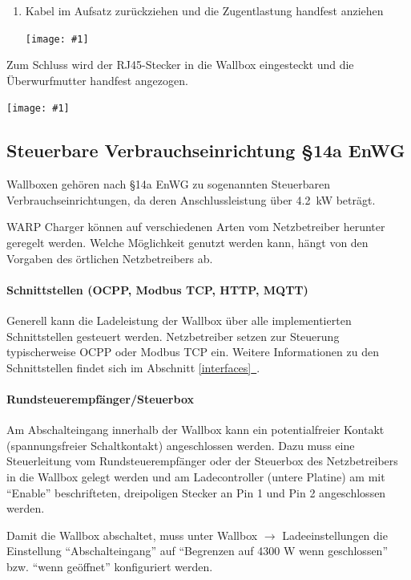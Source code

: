 \documentclass[a4paper,10pt]{article}
\newcommand{\gfx}[1]{\texttt{[image: \#1]}}
\newcommand*{\fullref}[1]{Abschnitt \hyperref[{#1}]{\ref*{#1}~\nameref*{#1}}}
\begin{document}
\begin{multicols*}{2}
\begin{enumerate}
        \item Kabel im Aufsatz zurückziehen und die Zugentlastung handfest anziehen

        \gfx{./img_warp2/resized/warp2_rj45_2_600}
    \end{enumerate}

    Zum Schluss wird der RJ45-Stecker in die Wallbox eingesteckt und die Überwurfmutter
    handfest angezogen.

    \gfx{./img_warp2/resized/warp2_ethernet4_600} %

    \subsection{Steuerbare Verbrauchseinrichtung \S14a EnWG}
    Wallboxen gehören nach \S14a EnWG zu sogenannten Steuerbaren
    Verbrauchseinrichtungen, da deren Anschlussleistung über \SI{4,2}{\kilo\watt} beträgt.

    WARP Charger können auf verschiedenen Arten vom Netzbetreiber herunter
    geregelt werden. Welche Möglichkeit genutzt werden kann, hängt von den
    Vorgaben des örtlichen Netzbetreibers ab.

    \paragraph*{Schnittstellen (OCPP, Modbus TCP, HTTP, MQTT)}
    Generell kann die Ladeleistung der Wallbox über alle implementierten Schnittstellen gesteuert werden.
    Netzbetreiber setzen zur Steuerung typischerweise OCPP oder Modbus TCP ein.
    Weitere Informationen zu den Schnittstellen findet sich im \fullref{interfaces}.

    \paragraph*{Rundsteuerempfänger/Steuerbox}
    Am Abschalteingang innerhalb der Wallbox kann ein potentialfreier Kontakt (spannungsfreier Schaltkontakt)
    angeschlossen werden. Dazu muss eine Steuerleitung vom Rundsteuerempfänger
    oder der Steuerbox des Netzbetreibers in die Wallbox gelegt werden und am Ladecontroller (untere Platine)
    am mit \enquote{Enable} beschrifteten, dreipoligen Stecker an Pin 1 und Pin 2 angeschlossen werden.

    Damit die Wallbox abschaltet, muss unter Wallbox $\rightarrow$ Ladeeinstellungen die Einstellung \enquote{Abschalteingang} auf \enquote{Begrenzen auf 4300 W wenn geschlossen} bzw. \enquote{wenn geöffnet} konfiguriert werden.


\end{multicols*}
\end{document}
